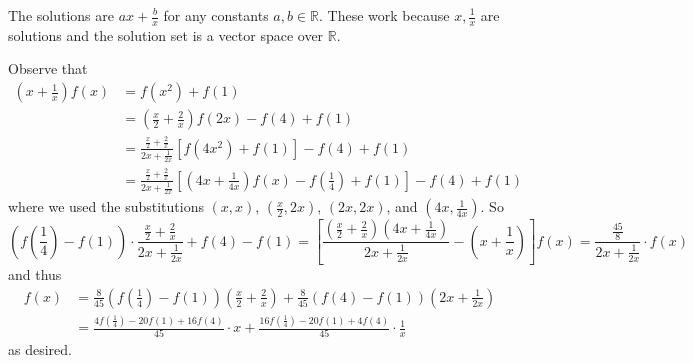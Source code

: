 The solutions are $ax+\frac{b}{x}$ for any constants $a,b\in\mathbb{R}$. These work because $x,\frac{1}{x}$ are solutions and the solution set is a vector space over $\mathbb{R}$.

Observe that
\begin{align*}
	\left(x+\frac{1}{x}\right)f(x)&=f(x^2)+f(1)\\
	&=\left(\frac{x}{2}+\frac{2}{x}\right)f(2x)-f(4)+f(1)\\
	&=\frac{\frac{x}{2}+\frac{2}{x}}{2x+\frac{1}{2x}}\left[f(4x^2)+f(1)\right]-f(4)+f(1)\\
	&=\frac{\frac{x}{2}+\frac{2}{x}}{2x+\frac{1}{2x}}\left[\left(4x+\frac{1}{4x}\right)f(x)-f(\frac{1}{4})+f(1)\right]-f(4)+f(1)
\end{align*}
where we used the substitutions $(x,x)$, $(\frac{x}{2},2x)$, $(2x,2x)$, and $(4x,\frac{1}{4x})$. So \[\left(f(\frac{1}{4})-f(1)\right)\cdot\frac{\frac{x}{2}+\frac{2}{x}}{2x+\frac{1}{2x}}+f(4)-f(1)=\left[\frac{\left(\frac{x}{2}+\frac{2}{x}\right)\left(4x+\frac{1}{4x}\right)}{2x+\frac{1}{2x}}-\left(x+\frac{1}{x}\right)\right]f(x)=\frac{\frac{45}{8}}{2x+\frac{1}{2x}}\cdot f(x)\] and thus
\begin{align*}
	f(x)&=\frac{8}{45}\left(f(\frac{1}{4})-f(1)\right)\left(\frac{x}{2}+\frac{2}{x}\right)+\frac{8}{45}\left(f(4)-f(1)\right)\left(2x+\frac{1}{2x}\right)\\
	&=\frac{4f(\frac{1}{4})-20f(1)+16f(4)}{45}\cdot x+\frac{16f(\frac{1}{4})-20f(1)+4f(4)}{45}\cdot\frac{1}{x}
\end{align*}
as desired.